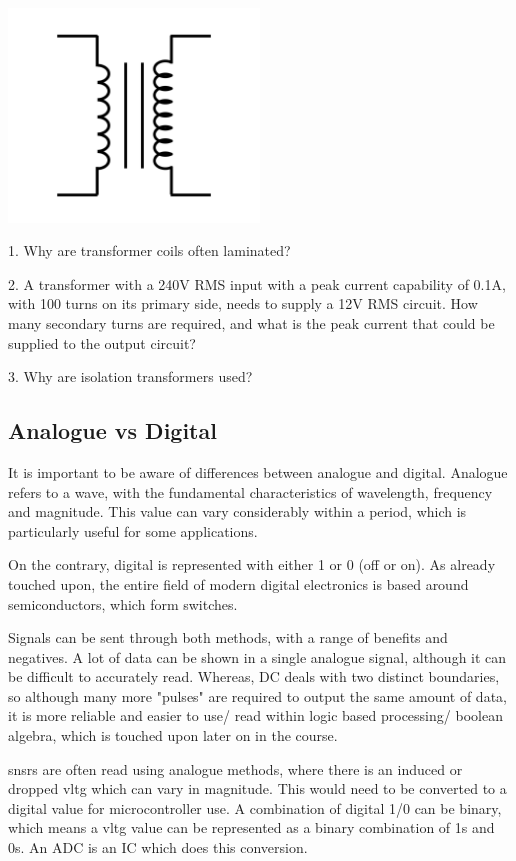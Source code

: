 \documentclass[a4paper,11pt]{report}
\newcommand{\Quiz}[1] %
{
\par\noindent %
\phantomsection %
\todo[inline, color=blue!30]{\textbf{#1}} %
\vspace{1em} %
}
\begin{document}
\includegraphics[width=0.5\textwidth]{transformer1}

\Quiz{Quiz}

1. Why are transformer coils often laminated?

2. A transformer with a 240V RMS input with a peak current capability of 0.1A, with 100 turns on its primary side, needs to supply a 12V RMS circuit. How many secondary turns are required, and what is the peak current that could be supplied to the output circuit?

3. Why are isolation transformers used?

\subsection{Analogue vs Digital}

It is important to be aware of differences between analogue and digital. Analogue refers to a wave, with the fundamental characteristics of wavelength, frequency and magnitude. This value can vary considerably within a period, which is particularly useful for some applications.

On the contrary, digital is represented with either 1 or 0 (off or on). As already touched upon, the entire field of modern digital electronics is based around semiconductors, which form switches.

Signals can be sent through both methods, with a range of benefits and negatives. A lot of data can be shown in a single analogue signal, although it can be difficult to accurately read. Whereas, DC deals with two distinct boundaries, so although many more "pulses" are required to output the same amount of data, it is more reliable and easier to use/ read within logic based processing/ boolean algebra, which is touched upon later on in the course.

\gls{snsr}s are often read using analogue methods, where there is an induced or dropped \gls{vltg} which can vary in magnitude. This would need to be converted to a digital value for microcontroller use. A combination of digital 1/0 can be binary, which means a \gls{vltg} value can be represented as a binary combination of 1s and 0s. An ADC is an IC which does this conversion.
\end{document}
